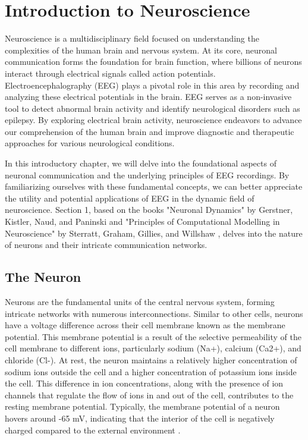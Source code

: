 \documentclass[a4paper, UKenglish, 11pt]{uiomaster}
\begin{document}
\chapter{Introduction to Neuroscience}
Neuroscience is a multidisciplinary field focused on understanding the complexities of the human brain and nervous system. At its core, neuronal communication forms the foundation for brain function, where billions of neurons interact through electrical signals called action potentials. Electroencephalography (EEG) plays a pivotal role in this area by recording and analyzing these electrical potentials in the brain. EEG serves as a non-invasive tool to detect abnormal brain activity and identify neurological disorders such as epilepsy. By exploring electrical brain activity, neuroscience endeavors to advance our comprehension of the human brain and improve diagnostic and therapeutic approaches for various neurological conditions.

In this introductory chapter, we will delve into the foundational aspects of neuronal communication and the underlying principles of EEG recordings. By familiarizing ourselves with these fundamental concepts, we can better appreciate the utility and potential applications of EEG in the dynamic field of neuroscience. Section 1, based on the books "Neuronal Dynamics" by Gerstner, Kistler, Naud, and Paninski \cite{gerstner2014neuronal} and "Principles of Computational Modelling in Neuroscience" by Sterratt, Graham, Gillies, and Willshaw \cite{sterratt2011principles}, delves into the nature of neurons and their intricate communication networks.




\section{The Neuron}

Neurons are the fundamental units of the central nervous system, forming intricate networks with numerous interconnections. Similar to other cells, neurons have a voltage difference across their cell membrane known as the membrane potential. This membrane potential is a result of the selective permeability of the cell membrane to different ions, particularly sodium (Na+), calcium (Ca2+), and chloride (Cl-). At rest, the neuron maintains a relatively higher concentration of sodium ions outside the cell and a higher concentration of potassium ions inside the cell. This difference in ion concentrations, along with the presence of ion channels that regulate the flow of ions in and out of the cell, contributes to the resting membrane potential. Typically, the membrane potential of a neuron hovers around -65 mV, indicating that the interior of the cell is negatively charged compared to the external environment \cite{sterratt2011principles}.
\end{document}
